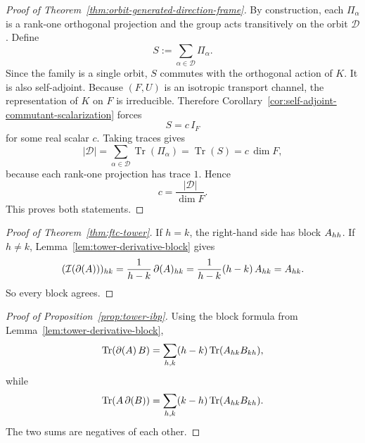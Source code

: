 \begin{proof}[Proof of Theorem~\ref{thm:orbit-generated-direction-frame}]
\label{proof:thm:orbit-generated-direction-frame}
By construction, each $\Pi_{\alpha}$ is a rank-one orthogonal projection and
the group acts transitively on the orbit $\mathcal D$. Define
\[
S:=\sum_{\alpha\in\mathcal D}\Pi_{\alpha}.
\]
Since the family is a single orbit, $S$ commutes with the orthogonal action of
$K$. It is also self-adjoint. Because $(F,U)$ is an isotropic transport
channel, the representation of $K$ on $F$ is irreducible. Therefore
Corollary~\ref{cor:self-adjoint-commutant-scalarization} forces
\[
S=c\,I_F
\]
for some real scalar $c$. Taking traces gives
\[
|\mathcal D|
=
\sum_{\alpha\in\mathcal D}\operatorname{Tr}(\Pi_{\alpha})
=
\operatorname{Tr}(S)
=
c\,\dim F,
\]
because each rank-one projection has trace $1$. Hence
\[
c=\frac{|\mathcal D|}{\dim F}.
\]
This proves both statements.
\end{proof}

\begin{proof}[Proof of Theorem~\ref{thm:ftc-tower}]
\label{proof:thm:ftc-tower}
If $h=k$, the right-hand side has block $A_{h h}$. If $h \neq k$,
Lemma~\ref{lem:tower-derivative-block} gives
\[
(\mathcal{I}(\partial(A)))_{h k}
=
\frac{1}{h-k}\, \partial(A)_{h k}
=
\frac{1}{h-k}(h-k)\, A_{h k}
=
A_{h k}.
\]
So every block agrees.
\end{proof}

\begin{proof}[Proof of Proposition~\ref{prop:tower-ibp}]
\label{proof:prop:tower-ibp}
Using the block formula from Lemma~\ref{lem:tower-derivative-block},
\[
\mathrm{Tr}(\partial(A)\, B)
=
\sum_{h,k} (h-k)\, \mathrm{Tr}(A_{h k}B_{k h}),
\]
while
\[
\mathrm{Tr}(A\, \partial(B))
=
\sum_{h,k} (k-h)\, \mathrm{Tr}(A_{h k}B_{k h}).
\]
The two sums are negatives of each other.
\end{proof}


